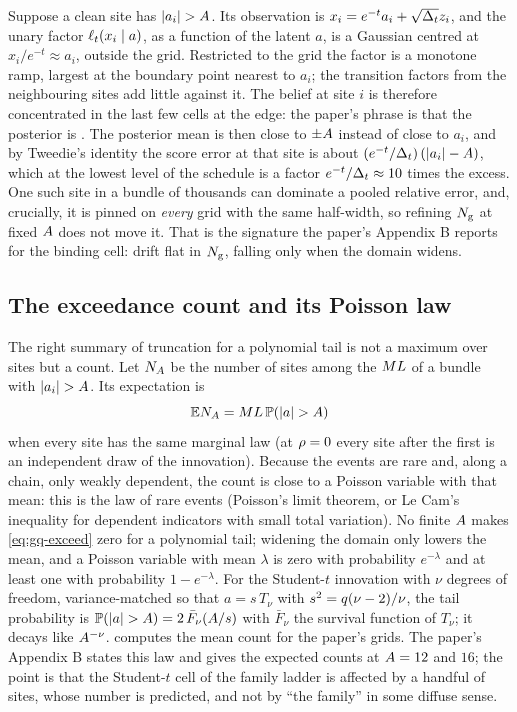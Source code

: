 Suppose a clean site has $|a_i|>\halfwidth$. Its observation is
$x_i=e^{-t}a_i+\sqrt{\Delta_t}z_i$, and the unary factor $\ell_t(x_i\mid a)$, as a function of
the latent $a$, is a Gaussian centred at $x_i/e^{-t}\approx a_i$, outside the grid.
Restricted to the grid the factor is a monotone ramp, largest at the boundary point
nearest to $a_i$; the transition factors from the neighbouring sites add little
against it. The belief at site $i$ is therefore concentrated in the last few cells at
the edge: the paper's phrase is that the posterior is .
The posterior mean is then close to $\pm A$ instead of close to $a_i$, and by
Tweedie's identity the score error at that site is about
$(e^{-t}/\Delta_t)\,(|a_i|-A)$, which at the lowest level of the schedule is a
factor $e^{-t}/\Delta_t\approx10$ times the excess. One such site in a bundle of thousands
can dominate a pooled relative error, and, crucially, it is pinned on \emph{every}
grid with the same half-width, so refining $N_{\mathrm{g}}$ at fixed $A$ does not
move it. That is the signature the paper's Appendix B reports for the binding cell:
drift flat in $N_{\mathrm{g}}$, falling only when the domain widens.

\subsection{The exceedance count and its Poisson law}

The right summary of truncation for a polynomial tail is not a maximum over sites but
a count. Let $N_{A}$ be the number of sites among the $ML$ of a
bundle with $|a_i|>\halfwidth$. Its expectation is
\begin{equation}
  \E N_{\halfwidth}=\nseq\nsites\,\Prob(|a|>\halfwidth)
  \label{eq:gq-exceed}
\end{equation}
when every site has the same marginal law (at $\rho=0$ every site after the first is
an independent draw of the innovation). Because the events are rare and, along a
chain, only weakly dependent, the count is close to a Poisson variable with that mean:
this is the law of rare events (Poisson's limit theorem, or Le Cam's inequality for
dependent indicators with small total variation). No finite $A$ makes
\cref{eq:gq-exceed} zero for a polynomial tail; widening the domain only lowers the
mean, and a Poisson variable with mean $\lambda$ is zero with probability $e^{-\lambda}$
and at least one with probability $1-e^{-\lambda}$. For the Student-$t$ innovation with
$\nu$ degrees of freedom, variance-matched so that $a=s\,T_\nu$ with
$s^2=q(\nu-2)/\nu$, the tail probability is
$\Prob(|a|>\halfwidth)=2\,\bar F_\nu(\halfwidth/s)$ with $\bar F_\nu$ the survival
function of $T_\nu$; it decays like $A^{-\nu}$. 
computes the mean count for the paper's grids. The paper's Appendix B states this law
and gives the expected counts at $A=12$ and $16$; the point is that the
Student-$t$ cell of the family ladder is affected by a handful of sites, whose number
is predicted, and not by ``the family'' in some diffuse sense.

